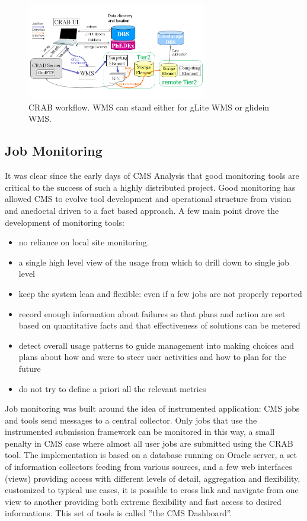 \begin{figure}
 \includegraphics[width=0.70\textwidth]{figures/CRABWorkflow.png}
\caption{CRAB workflow. WMS can stand either for gLite WMS or glidein WMS.}
\label{fig:CRABWorkflow}
\end{figure}

\subsection{Job Monitoring}
\label{sec:3_3}
It was clear since the early days of CMS Analysis that
good monitoring tools are critical to the success of such
a highly distributed project.
Good monitoring has allowed CMS to evolve tool development
and operational structure from vision and anedoctal driven
to a fact based approach.
A few main point drove the development of monitoring tools:
\begin{itemize}
\item no reliance on local site monitoring.
\item a single  high level view of the usage from which
  to drill down to single job level
\item   keep the system lean and flexible: even if a few
  jobs are not properly reported
\item record
  enough information about failures so that plans and
action are set
  based on quantitative facts and that effectiveness of solutions can be metered
\item detect overall usage patterns to guide management into making
 choices and plans about how and were to steer user activities and
 how to plan for the future
\item do not try to define a priori all the relevant metrics
\end{itemize}

Job monitoring was built around the idea of instrumented
application: CMS jobs and tools send messages
to a central collector. Only jobs that use the
instrumented submission framework can be monitored in this way,
a small penalty in CMS case where almost
all user jobs are submitted using the CRAB tool.
The implementation is based on a
database running on Oracle server, a set of information collectors
feeding from various sources, 
and a few web interfaces (views) providing access with different levels
of detail, aggregation and flexibility, customized to
typical use cases, it is possible to cross link and navigate
from one view to another providing both extreme flexibility
and fast access to desired informations.
This set of tools is called ''the CMS Dashboard''.


